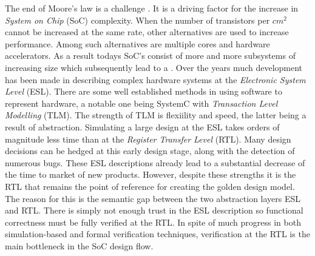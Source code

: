 
The end  of Moore's law is a challenge .  It is a driving factor for the increase in \textit{System on Chip} (SoC) complexity.  When the number of transistors per $cm^2$ cannot be increased at the same rate, other alternatives are used to increase performance. Among such alternatives are multiple cores and hardware accelerators. As a result todays SoC's  consist of more and more subsystems of increasing size which subsequently lead to a . Over the years much development has been made in describing complex hardware systems at the \textit{Electronic System Level} (ESL). There are some well established methods in using software to represent hardware, a notable one being SystemC with \textit{Transaction Level Modelling} (TLM). The strength of TLM is flexiility and speed, the latter being a result of abstraction. Simulating a large design at the ESL takes orders of magnitude less time than at the \textit{Register Transfer Level} (RTL). Many design decisions can be hedged at this early design stage, along with the detection of numerous bugs. These ESL descriptions already lead to a substantial decrease of the time to market of new products. However, despite these strengths it is the RTL that remains the point of reference for creating the golden design model. The reason for this is the semantic gap between the two abstraction layers ESL and RTL. There is simply not enough trust in the ESL description so functional correctness must be fully verified at the RTL. In spite of much progress in both simulation-based and formal verification techniques, verification at the RTL is the main bottleneck in the SoC design flow. \\
\TLDEL{\newline}  
